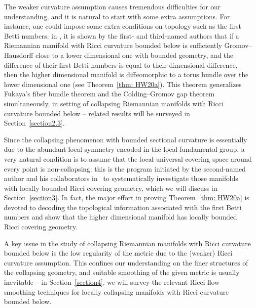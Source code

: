 \documentclass[pdftex]{sigma}
\numberwithin{equation}{section}
\begin{document}
The weaker curvature assumption causes tremendous
difficulties for our understanding, and it is natural to start with some
extra assumptions. For instance, one could impose some extra conditions on
topology such as the first Betti numbers: in \cite{HW20a}, it is shown
by the first- and third-named authors that if a Riemannian manifold with Ricci
curvature bounded below is sufficiently Gromov--Hausdorff close to a lower
dimensional one with bounded geometry, and the difference of their first Betti
numbers is equal to their dimensional difference, then the higher dimensional
manifold is diffeomorphic to a torus bundle over the lower dimensional one
(see Theorem~\ref{thm: HW20a}). This theorem generalizes Fukaya's fiber bundle
theorem and the Colding--Gromov gap theorem simultaneously, in setting of
collapsing Riemannian manifolds with Ricci curvature bounded below -- related
results will be surveyed in Section~\ref{section2.3}.

Since the collapsing phenomenon with bounded sectional curvature is essentially
due to the abundant local symmetry encoded in the local fundamental group, a
very natural condition is to assume that the local universal covering space
around every point is non-collapsing: this is the program initiated by the
second-named author and his collaborators in~\cite{HKRX18} to systematically
investigate those manifolds with locally bounded Ricci covering geometry, which
we will discuss in Section~\ref{section3}.
In fact, the major effort in proving Theorem~\ref{thm: HW20a} is devoted to
decoding the topological information associated with the first Betti numbers
and show that the higher dimensional manifold has locally bounded Ricci
covering geometry.

A key issue in the study of collapsing Riemannian manifolds with Ricci curvature
bounded below is the low regularity of the metric due to the (weaker) Ricci
curvature assumption. This confines our understanding on the finer structures
of the collapsing geometry, and suitable smoothing of the given metric is
usually inevitable -- in Section~\ref{section4}, we will survey the relevant Ricci flow
smoothing techniques for locally collapsing manifolds with Ricci curvature
bounded below.
\end{document}

